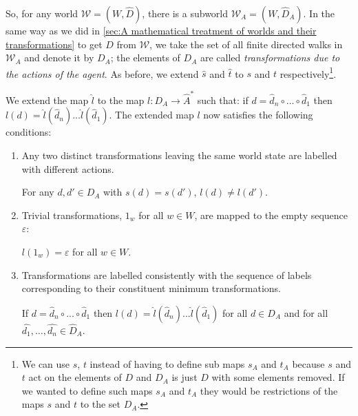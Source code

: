 So, for any world $\mathscr{W} = (W, \hat{D})$, there is a subworld $\mathscr{W}_{A} = (W, \hat{D}_{A})$.
In the same way as we did in \cref{sec:A mathematical treatment of worlds and their transformations} to get $D$ from $\mathscr{W}$, we take the set of all finite directed walks in $\mathscr{W}_{A}$ and denote it by $D_{A}$; the elements of $D_{A}$ are called \emph{transformations due to the actions of the agent}.
As before, we extend $\hat{s}$ and $\hat{t}$ to $s$ and $t$ respectively\footnote{
	We can use $s$, $t$ instead of having to define sub maps $s_{A}$ and $t_{A}$ because $s$ and $t$ act on the elements of $D$ and $D_{A}$ is just $D$ with some elements removed.
	If we wanted to define such maps $s_{A}$ and $t_{A}$ they would be restrictions of the maps $s$ and $t$ to the set $D_{A}$.
}.

We extend the map $\hat{l}$ to the map $l: D_{A} \to \hat{A}^{\ast}$ such that:
if $d = \hat{d}_{n} \circ ... \circ \hat{d}_{1}$ then $l(d) = \hat{l}(\hat{d}_{n}) ... \hat{l}(\hat{d}_{1})$.
The extended map $l$ now satisfies the following conditions:
\begin{enumerate}
	\item Any two distinct transformations leaving the same world state are
	      labelled with different actions.
	      \begin{action_condition}[Uniqueness]\label{actcon:action_gives_single_outcome}
		      For any $d,d' \in D_{A}$ with $s(d)=s(d')$, $l(d) \neq l(d')$.
	      \end{action_condition}

	\item Trivial transformations, $1_{w}$ for all $w \in W$, are mapped to the empty sequence $\varepsilon$:
	      \begin{action_condition}[Identity]\label{actcon:trivial_transformations_mapped_to_empty_sequence}
		      $l(1_{w}) = \varepsilon$ for all $w \in W$.
	      \end{action_condition}

	\item Transformations are labelled consistently with the sequence of labels corresponding to their constituent minimum transformations.
	      \begin{action_condition}\label{actcon:composition_consistency}
		      If $d = \hat{d}_{n} \circ ... \circ \hat{d}_{1}$ then $l(d) = \hat{l}(\hat{d}_{n}) ... \hat{l}(\hat{d}_{1})$ for all $d \in D_{A}$ and for all $\hat{d_{1}}, \dots , \hat{d_{n}} \in \hat{D}_{A}$.
	      \end{action_condition}
\end{enumerate}

